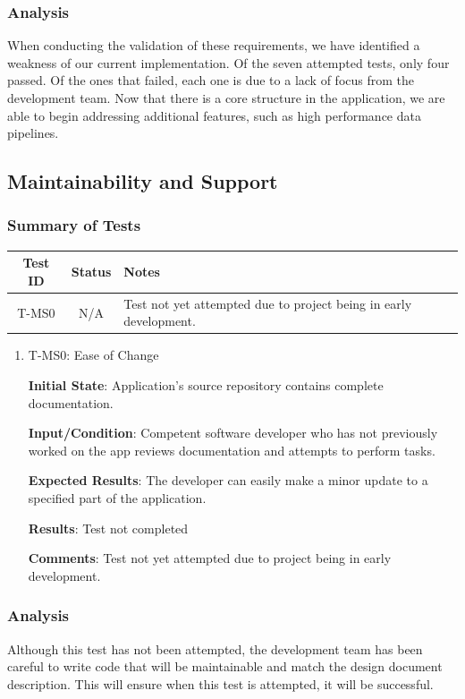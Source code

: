 \documentclass[12pt, titlepage]{article}
\begin{document}
\subsubsection{Analysis}
When conducting the validation of these requirements, we have identified a weakness of our current implementation. Of the seven attempted tests, only four passed. Of the ones that failed,
each one is due to a lack of focus from the development team. Now that there is a core structure in the application, we are able to begin addressing additional features, such as high performance data pipelines. 

\subsection{Maintainability and Support}
\subsubsection{Summary of Tests}
\begin{center}
    \begin{tabular}{|c|c|l|}
        \hline
        \textbf{Test ID} & \textbf{Status} & \textbf{Notes}\\
        \hline
        T-MS0 & N/A & Test not yet attempted due to project being in early development.\\
        \hline
    \end{tabular}
\end{center}
\begin{enumerate}

\item{T-MS0: Ease of Change\\}

					
\textbf{Initial State}: Application's source repository contains complete documentation.
					
\textbf{Input/Condition}: Competent software developer who has not previously worked on the app reviews documentation and attempts to perform tasks.
					
\textbf{Expected Results}: The developer can easily make a minor update to a specified part of the application.
	
\textbf{Results}: Test not completed

\textbf{Comments}: Test not yet attempted due to project being in early development.
\end{enumerate}
\subsubsection{Analysis}
Although this test has not been attempted, the development team has been careful to write code that will be maintainable and match the design document description. This will ensure when this test is attempted, it will be successful.
\end{document}
